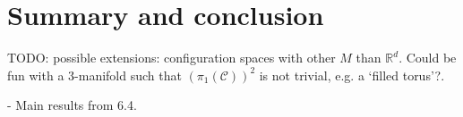 \chapter{Summary and conclusion}

TODO: possible extensions: configuration spaces with other $M$ than $\mathbb{R}^d$. Could be fun with a 3-manifold such that $(\pi_1(\mathcal{C}))^2$ is not trivial, e.g. a `filled torus'?.

- Main results from 6.4.

